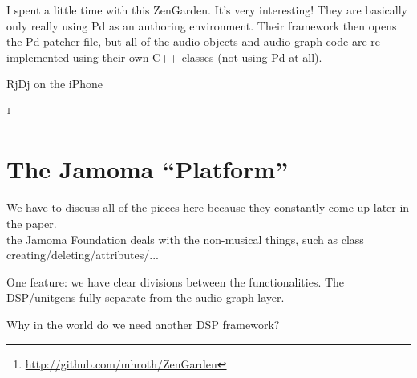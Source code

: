 \documentclass[twoside,10pt]{article}
\begin{document}
I spent a little time with this ZenGarden.  It's very interesting!
They are basically only really using Pd as an authoring environment.
Their framework then opens the Pd patcher file, but all of the audio
objects and audio graph code are re-implemented using their own C++
classes (not using Pd at all).

RjDj on the iPhone

\footnote{\url{http://github.com/mhroth/ZenGarden}}







\section{The Jamoma ``Platform''} %

We have to discuss all of the pieces here because they constantly come up later in the paper.\\

the Jamoma Foundation deals with the non-musical things, such as class creating/deleting/attributes/...

One feature: we have clear divisions between the functionalities.   The DSP/unitgens fully-separate from the audio graph layer.



Why in the world do we need another DSP framework?

%
\end{document}
